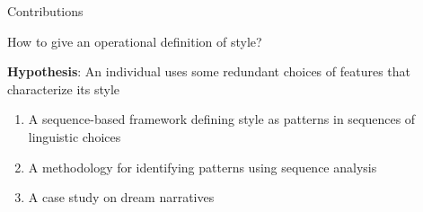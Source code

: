 \documentclass[handout,10pt]{beamer}
\begin{document}
\begin{frame}{Contributions}

How to give an operational definition of style?

\vspace{0.25cm}
\pause

\textbf{Hypothesis}: An individual uses some redundant choices of features that characterize its style

\vspace{0.25cm}
\pause



\begin{enumerate}[<+->]
    \item A sequence-based framework defining style as patterns in sequences of linguistic choices%
    \item A methodology for identifying patterns using sequence analysis
    \item A case study on dream narratives %
\end{enumerate}
    
\end{frame}
\end{document}
